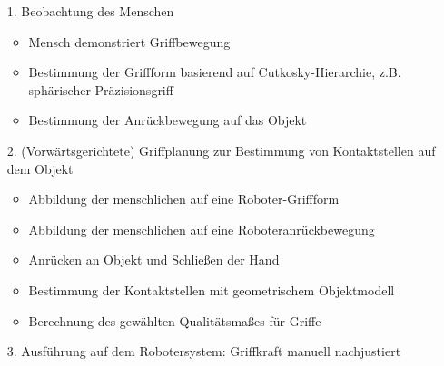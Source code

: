 \begin{itemize}
\item[1.] Beobachtung des Menschen
\begin{itemize}
\item Mensch demonstriert Griffbewegung
\item Bestimmung der Griffform basierend auf Cutkosky-Hierarchie, z.B. sphärischer Präzisionsgriff
\item Bestimmung der Anrückbewegung auf das Objekt
\end{itemize} 
\item[2.] (Vorwärtsgerichtete) Griffplanung zur Bestimmung von Kontaktstellen auf dem Objekt
\begin{itemize}
\item Abbildung der menschlichen auf eine Roboter-Griffform
\item Abbildung der menschlichen auf eine Roboteranrückbewegung
\item Anrücken an Objekt und Schließen der Hand
\item Bestimmung der Kontaktstellen mit geometrischem Objektmodell
\item Berechnung des gewählten Qualitätsmaßes für Griffe
\end{itemize}
\item[3.] Ausführung auf dem Robotersystem: Griffkraft manuell nachjustiert
\end{itemize}